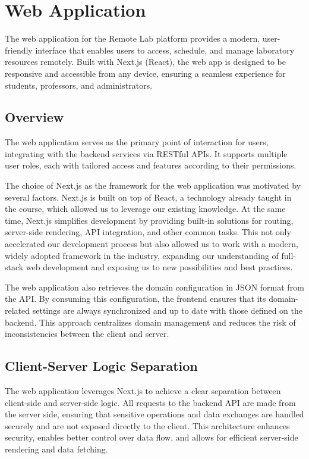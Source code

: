 \section{Web Application}

The web application for the Remote Lab platform provides a modern, user-friendly interface that enables users to access, schedule, and manage laboratory resources remotely. Built with Next.js (React), the web app is designed to be responsive and accessible from any device, ensuring a seamless experience for students, professors, and administrators.

\subsection{Overview}
The web application serves as the primary point of interaction for users, integrating with the backend services via RESTful APIs. It supports multiple user roles, each with tailored access and features according to their permissions.

The choice of Next.js as the framework for the web application was motivated by several factors. Next.js is built on top of React, a technology already taught in the course, which allowed us to leverage our existing knowledge. At the same time, Next.js simplifies development by providing built-in solutions for routing, server-side rendering, API integration, and other common tasks. This not only accelerated our development process but also allowed us to work with a modern, widely adopted framework in the industry, expanding our understanding of full-stack web development and exposing us to new possibilities and best practices.

The web application also retrieves the domain configuration in JSON format from the API. By consuming this configuration, the frontend ensures that its domain-related settings are always synchronized and up to date with those defined on the backend. This approach centralizes domain management and reduces the risk of inconsistencies between the client and server.

\subsection{Client-Server Logic Separation}

The web application leverages Next.js to achieve a clear separation between client-side and server-side logic. All requests to the backend API are made from the server side, ensuring that sensitive operations and data exchanges are handled securely and are not exposed directly to the client. This architecture enhances security, enables better control over data flow, and allows for efficient server-side rendering and data fetching.

